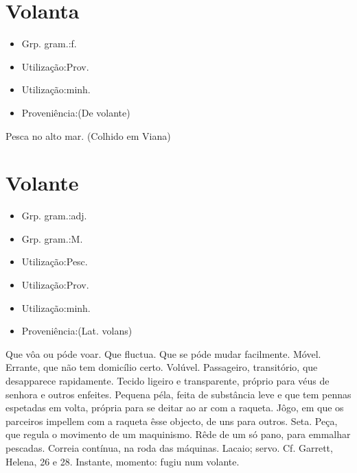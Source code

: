 \documentclass{article}
\begin{document}
\section{Volanta}
\begin{itemize}
\item {Grp. gram.:f.}
\end{itemize}
\begin{itemize}
\item {Utilização:Prov.}
\end{itemize}
\begin{itemize}
\item {Utilização:minh.}
\end{itemize}
\begin{itemize}
\item {Proveniência:(De \textunderscore volante\textunderscore )}
\end{itemize}
Pesca no alto mar. (Colhido em Viana)
\section{Volante}
\begin{itemize}
\item {Grp. gram.:adj.}
\end{itemize}
\begin{itemize}
\item {Grp. gram.:M.}
\end{itemize}
\begin{itemize}
\item {Utilização:Pesc.}
\end{itemize}
\begin{itemize}
\item {Utilização:Prov.}
\end{itemize}
\begin{itemize}
\item {Utilização:minh.}
\end{itemize}
\begin{itemize}
\item {Proveniência:(Lat. \textunderscore volans\textunderscore )}
\end{itemize}
Que vôa ou póde voar.
Que fluctua.
Que se póde mudar facilmente.
Móvel.
Errante, que não tem domicílio certo.
Volúvel.
Passageiro, transitório, que desapparece rapidamente.
Tecido ligeiro e transparente, próprio para véus de senhora e outros enfeites.
Pequena péla, feita de substância leve e que tem pennas espetadas em volta, própria para se deitar ao ar com a raqueta.
Jôgo, em que os parceiros impellem com a raqueta êsse objecto, de uns para outros.
Seta.
Peça, que regula o movimento de um maquinismo.
Rêde de um só pano, para emmalhar pescadas.
Correia contínua, na roda das máquinas.
Lacaio; servo. Cf. Garrett, \textunderscore Helena\textunderscore , 26 e 28.
Instante, momento: \textunderscore fugiu num volante\textunderscore .
\end{document}
